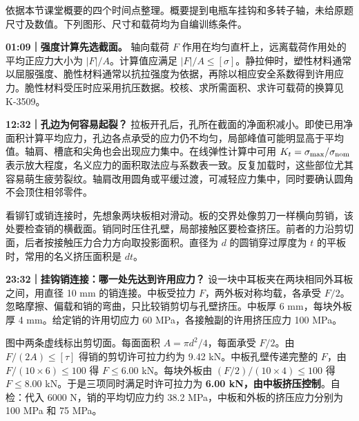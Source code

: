 \documentclass[zihao=5,a4paper,UTF8,fontset=fandol]{ctexart}
\begin{document}
依据本节课堂概要的四个时间点整理。概要提到电瓶车挂钩和多转子轴，未给原题尺寸及数值。下列图形、尺寸和载荷均为自编训练条件。


\textbf{01:09｜强度计算先选截面。} 轴向载荷 $F$ 作用在均匀直杆上，远离载荷作用处的平均正应力大小为 $|F|/A$。计算值应满足 $|F|/A\leq[\sigma]$。静拉伸时，塑性材料通常以屈服强度、脆性材料通常以抗拉强度为依据，再除以相应安全系数得到许用应力。脆性材料受压时应采用抗压数据。校核、求所需面积、求许可载荷的换算见 K-3509。


\textbf{12:32｜孔边为何容易起裂？} 拉板开孔后，孔所在截面的净面积减小。即使已用净面积计算平均应力，孔边各点承受的应力仍不均匀，局部峰值可能明显高于平均值。轴肩、槽底和尖角也会出现应力集中。在线弹性计算中可用 $K_t=\sigma_{\max}/\sigma_{\rm nom}$ 表示放大程度，名义应力的面积取法应与系数表一致。反复加载时，这些部位尤其容易萌生疲劳裂纹。轴肩改用圆角或平缓过渡，可减轻应力集中，同时要确认圆角不会顶住相邻零件。


看铆钉或销连接时，先想象两块板相对滑动。板的交界处像剪刀一样横向剪销，该处要检查销的横截面。销同时压住孔壁，局部接触区要检查挤压。前者的力沿剪切面，后者按接触压力合力方向取投影面积。直径为 $d$ 的圆销穿过厚度为 $t$ 的平板时，常用的名义挤压面积是 $dt$。


\textbf{23:32｜挂钩销连接：哪一处先达到许用应力？} 设一块中耳板夹在两块相同外耳板之间，用直径 10 mm 的销连接。中板受拉力 $F$，两外板对称均载，各承受 $F/2$。忽略摩擦、偏载和销的弯曲，只比较销剪切与孔壁挤压。中板厚 6 mm，每块外板厚 4 mm。给定销的许用切应力 60 MPa，各接触副的许用挤压应力 100 MPa。


\begin{center}
\end{center}


图中两条虚线标出剪切面。每面面积 $A=\pi d^2/4$，每面承受 $F/2$。由 $F/(2A)\leq[\tau]$ 得销的剪切许可拉力约为 9.42 kN。中板孔壁传递完整的 $F$，由 $F/(10\times6)\leq100$ 得 $F\leq6.00$ kN。每块外板由 $(F/2)/(10\times4)\leq100$ 得 $F\leq8.00$ kN。于是三项同时满足时许可拉力为 \textbf{6.00 kN，由中板挤压控制}。自检：代入 6000 N，销的平均切应力约 38.2 MPa，中板和外板的挤压应力分别为 100 MPa 和 75 MPa。
\end{document}
